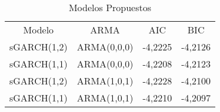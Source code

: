 \begin{table}[!h]
 



\begin{center}
    

\begin{tabular}[!h]{|c | c | c | c| } \hline
	
	\rowcolor{cyan} \multicolumn{4}{ |c| }{ \textbf{Modelos Propuestos }} \\ \hline
	 \hline
	

\rowcolor{red}  Modelo & ARMA & AIC & BIC \\\hline
	  
	                sGARCH(1,2) &	ARMA(0,0,0)	& 	-4,2225	& -4,2126  \\\hline
                    sGARCH(1,1) &	ARMA(0,0,0)	& 	-4,2208	& -4,2123   \\\hline
\rowcolor{yellow}   sGARCH(1,2) &	ARMA(1,0,1)	& 	-4,2228	& -4,2100    \\\hline
                    sGARCH(1,1) &	ARMA(1,0,1)	&	-4,2210	& -4,2097     \\\hline
	     
	
	\end{tabular}
	\caption{Modelos Propuestos}
	\label{Modelos Propuestos}
	
\end{center}

\end{table}